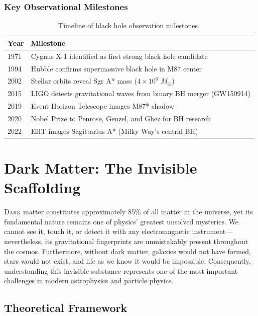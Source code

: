 \documentclass[11pt,a4paper]{article}
\newcommand{\msun}{M_\odot}
\begin{document}
\subsubsection{Key Observational Milestones}

\begin{table}[H]
\centering
\caption{Timeline of black hole observation milestones.}
\label{tab:bh_timeline}
\begin{tabular}{|l|l|}
\hline
\textbf{Year} & \textbf{Milestone} \\
\hline
1971 & Cygnus X-1 identified as first strong black hole candidate \\
1994 & Hubble confirms supermassive black hole in M87 center \\
2002 & Stellar orbits reveal Sgr A* mass ($4 \times 10^6$ $\msun$) \\
2015 & LIGO detects gravitational waves from binary BH merger (GW150914) \\
2019 & Event Horizon Telescope images M87* shadow \\
2020 & Nobel Prize to Penrose, Genzel, and Ghez for BH research \\
2022 & EHT images Sagittarius A* (Milky Way's central BH) \\
\hline
\end{tabular}
\end{table}

\newpage

\section{Dark Matter: The Invisible Scaffolding}
\label{sec:darkmatter}

\lettrine[lines=3, loversize=0.1, nindent=0.5em]{D}{ark} matter constitutes approximately 85\% of all matter in the universe, yet its fundamental nature remains one of physics' greatest unsolved mysteries. We cannot see it, touch it, or detect it with any electromagnetic instrument---nevertheless, its gravitational fingerprints are unmistakably present throughout the cosmos. Furthermore, without dark matter, galaxies would not have formed, stars would not exist, and life as we know it would be impossible. Consequently, understanding this invisible substance represents one of the most important challenges in modern astrophysics and particle physics.

\subsection{Theoretical Framework}
\end{document}
